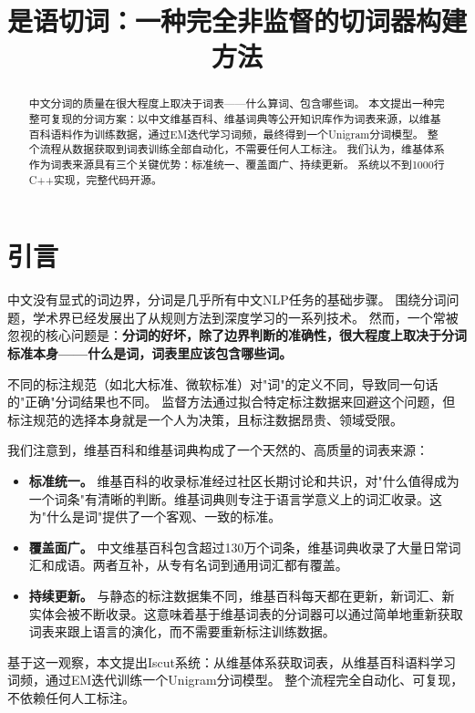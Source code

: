 \documentclass[11pt,a4paper]{article}
\title{是语切词：一种完全非监督的切词器构建方法}
\author{}
\date{}
\begin{document}
\maketitle

\begin{abstract}
中文分词的质量在很大程度上取决于词表——什么算词、包含哪些词。
本文提出一种完整可复现的分词方案：以中文维基百科、维基词典等公开知识库作为词表来源，以维基百科语料作为训练数据，通过EM迭代学习词频，最终得到一个Unigram分词模型。
整个流程从数据获取到词表训练全部自动化，不需要任何人工标注。
我们认为，维基体系作为词表来源具有三个关键优势：标准统一、覆盖面广、持续更新。
系统以不到1000行C++实现，完整代码开源。
\end{abstract}

\section{引言}

中文没有显式的词边界，分词是几乎所有中文NLP任务的基础步骤。
围绕分词问题，学术界已经发展出了从规则方法到深度学习的一系列技术。
然而，一个常被忽视的核心问题是：\textbf{分词的好坏，除了边界判断的准确性，很大程度上取决于分词标准本身——什么是词，词表里应该包含哪些词。}

不同的标注规范（如北大标准、微软标准）对"词"的定义不同，导致同一句话的"正确"分词结果也不同。
监督方法通过拟合特定标注数据来回避这个问题，但标注规范的选择本身就是一个人为决策，且标注数据昂贵、领域受限。

我们注意到，维基百科和维基词典构成了一个天然的、高质量的词表来源：

\begin{itemize}
    \item \textbf{标准统一。} 维基百科的收录标准经过社区长期讨论和共识，对"什么值得成为一个词条"有清晰的判断。维基词典则专注于语言学意义上的词汇收录。这为"什么是词"提供了一个客观、一致的标准。
    \item \textbf{覆盖面广。} 中文维基百科包含超过130万个词条，维基词典收录了大量日常词汇和成语。两者互补，从专有名词到通用词汇都有覆盖。
    \item \textbf{持续更新。} 与静态的标注数据集不同，维基百科每天都在更新，新词汇、新实体会被不断收录。这意味着基于维基词表的分词器可以通过简单地重新获取词表来跟上语言的演化，而不需要重新标注训练数据。
\end{itemize}

基于这一观察，本文提出Iscut系统：从维基体系获取词表，从维基百科语料学习词频，通过EM迭代训练一个Unigram分词模型。
整个流程完全自动化、可复现，不依赖任何人工标注。
\end{document}
